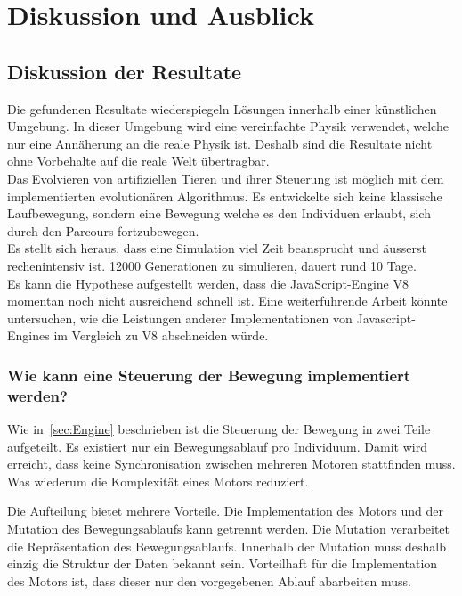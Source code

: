 %
%


\chapter{Diskussion und Ausblick\label{chap:perspective}}

  \section{Diskussion der Resultate\label{sec:diskRes}}

    Die gefundenen Resultate wiederspiegeln Lösungen innerhalb einer künstlichen Umgebung.
    In dieser Umgebung wird eine vereinfachte Physik verwendet, welche nur eine Annäherung an die reale Physik ist.
    Deshalb sind die Resultate nicht ohne Vorbehalte auf die reale Welt übertragbar.
    \\
    Das Evolvieren von artifiziellen Tieren und ihrer Steuerung ist möglich
    mit dem implementierten evolutionären Algorithmus.
    Es entwickelte sich keine klassische Laufbewegung,
    sondern eine Bewegung welche es den Individuen erlaubt, sich durch den Parcours fortzubewegen.
    \\
    Es stellt sich heraus, dass eine Simulation viel Zeit beansprucht und äusserst rechenintensiv ist.
    12000 Generationen zu simulieren, dauert rund 10 Tage.
    \\
    Es kann die Hypothese aufgestellt werden, dass die JavaScript-Engine V8 momentan noch nicht ausreichend schnell ist.
    Eine weiterführende Arbeit könnte untersuchen,
    wie die Leistungen anderer Implementationen von Javascript-Engines im Vergleich zu V8 abschneiden würde.

    \subsection{Wie kann eine Steuerung der Bewegung implementiert werden?}

      Wie in~\vref{sec:Engine} beschrieben ist die Steuerung der Bewegung in zwei Teile aufgeteilt.
      Es existiert nur ein Bewegungsablauf pro Individuum.
      Damit wird erreicht, dass keine Synchronisation zwischen mehreren Motoren stattfinden muss.
      Was wiederum die Komplexität eines Motors reduziert.

      \smallskip

      Die Aufteilung bietet mehrere Vorteile.
      Die Implementation des Motors und der Mutation des Bewegungsablaufs kann getrennt werden.
      Die Mutation verarbeitet die Repräsentation des Bewegungsablaufs.
      Innerhalb der Mutation muss deshalb einzig die Struktur der Daten bekannt sein.
      Vorteilhaft für die Implementation des Motors ist, dass dieser nur den vorgegebenen Ablauf abarbeiten muss.


